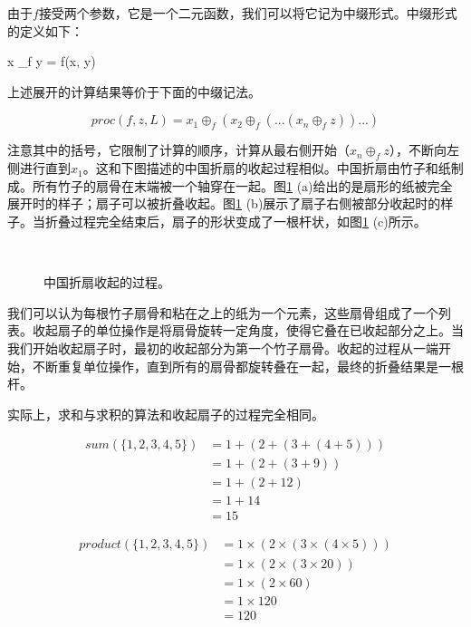 \documentclass[UTF8]{article}
\begin{document}
由于$f$接受两个参数，它是一个二元函数，我们可以将它记为中缀形式。中缀形式的定义如下：

\be
x \oplus_f y = f(x, y)
\ee

上述展开的计算结果等价于下面的中缀记法。

\[
proc(f, z, L) = x_1 \oplus_f (x_2 \oplus_f (... (x_n \oplus_f z))...)
\]

注意其中的括号，它限制了计算的顺序，计算从最右侧开始（$x_n \oplus_f z$），不断向左侧进行直到$x_1$。这和下图描述的中国折扇的收起过程相似。中国折扇由竹子和纸制成。所有竹子的扇骨在末端被一个轴穿在一起。图\ref{fig:fold-fan} (a)给出的是扇形的纸被完全展开时的样子；扇子可以被折叠收起。图\ref{fig:fold-fan} (b)展示了扇子右侧被部分收起时的样子。当折叠过程完全结束后，扇子的形状变成了一根杆状，如图\ref{fig:fold-fan} (c)所示。

\begin{figure}[htbp]
    \centering
     \\
    \caption{中国折扇收起的过程。} \label{fig:fold-fan}
\end{figure}

我们可以认为每根竹子扇骨和粘在之上的纸为一个元素，这些扇骨组成了一个列表。收起扇子的单位操作是将扇骨旋转一定角度，使得它叠在已收起部分之上。当我们开始收起扇子时，最初的收起部分为第一个竹子扇骨。收起的过程从一端开始，不断重复单位操作，直到所有的扇骨都旋转叠在一起，最终的折叠结果是一根杆。

实际上，求和与求积的算法和收起扇子的过程完全相同。

\[
\begin{array}{rl}
sum(\{1, 2, 3, 4, 5 \}) & = 1 + (2 + (3 + (4 + 5))) \\
         & = 1 + (2 + (3 + 9)) \\
         & = 1 + (2 + 12) \\
         & = 1 + 14 \\
         & = 15
\end{array}
\]

\[
\begin{array}{rl}
product(\{1, 2, 3, 4, 5 \}) & = 1 \times (2 \times (3 \times (4 \times 5))) \\
         & = 1 \times (2 \times (3 \times 20)) \\
         & = 1 \times (2 \times 60) \\
         & = 1 \times 120 \\
         & = 120
\end{array}
\]
\end{document}
